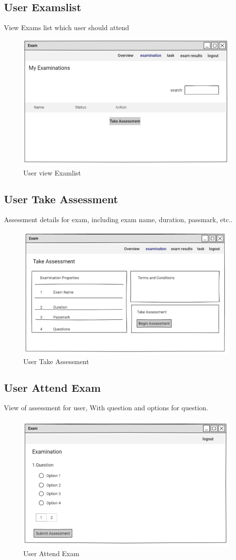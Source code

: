\documentclass[a4paper,12pt]{report}
\begin{document}
\subsection {User Examslist}
View Exams list which user should attend
\begin{figure}[bph]
	\centering
	\includegraphics[width=.4\linewidth]{img/user/useviewexamlist}
	\caption{User view Examlist}
	\end{figure}
\pagebreak
\subsection {User Take Assessment}
Assessment details for exam, including exam name, duration, passmark, etc..
\begin{figure}[bph]
	\centering
	\includegraphics[width=.6\linewidth]{img/user/examassessmnt}
	\caption{ User Take Assessment}
\end{figure}
\subsection {User Attend Exam}
View of assessment for user, With question and options for question.
\begin{figure}[bph]
	\centering
	\includegraphics[width=.6\linewidth]{img/user/attendexam}
	\caption{User Attend Exam}
\end{figure}
\pagebreak
\end{document}
